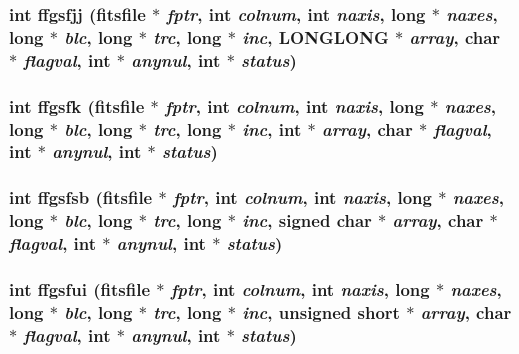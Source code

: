 \subsubsection{\setlength{\rightskip}{0pt plus 5cm}int ffgsfjj (\bf{fitsfile} $\ast$ {\em fptr}, int {\em colnum}, int {\em naxis}, long $\ast$ {\em naxes}, long $\ast$ {\em blc}, long $\ast$ {\em trc}, long $\ast$ {\em inc}, \bf{LONGLONG} $\ast$ {\em array}, char $\ast$ {\em flagval}, int $\ast$ {\em anynul}, int $\ast$ {\em status})}\label{fitsio__64_8h_928fae8967c2f8fbbd25314487385b55}


\subsubsection{\setlength{\rightskip}{0pt plus 5cm}int ffgsfk (\bf{fitsfile} $\ast$ {\em fptr}, int {\em colnum}, int {\em naxis}, long $\ast$ {\em naxes}, long $\ast$ {\em blc}, long $\ast$ {\em trc}, long $\ast$ {\em inc}, int $\ast$ {\em array}, char $\ast$ {\em flagval}, int $\ast$ {\em anynul}, int $\ast$ {\em status})}\label{fitsio__64_8h_0efb49c901a562ffccd69c4c87c47387}


\subsubsection{\setlength{\rightskip}{0pt plus 5cm}int ffgsfsb (\bf{fitsfile} $\ast$ {\em fptr}, int {\em colnum}, int {\em naxis}, long $\ast$ {\em naxes}, long $\ast$ {\em blc}, long $\ast$ {\em trc}, long $\ast$ {\em inc}, signed char $\ast$ {\em array}, char $\ast$ {\em flagval}, int $\ast$ {\em anynul}, int $\ast$ {\em status})}\label{fitsio__64_8h_e824866f99503c243fed85e3cce3aaf4}


\subsubsection{\setlength{\rightskip}{0pt plus 5cm}int ffgsfui (\bf{fitsfile} $\ast$ {\em fptr}, int {\em colnum}, int {\em naxis}, long $\ast$ {\em naxes}, long $\ast$ {\em blc}, long $\ast$ {\em trc}, long $\ast$ {\em inc}, unsigned short $\ast$ {\em array}, char $\ast$ {\em flagval}, int $\ast$ {\em anynul}, int $\ast$ {\em status})}\label{fitsio__64_8h_c591c8ea9be72a7c242e8f102f6ba3b4}


